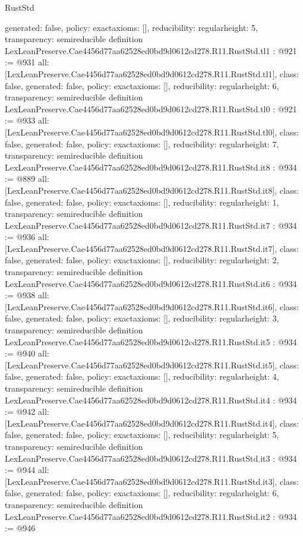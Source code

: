 \begin{lexlean}{RustStd}
\begin{coremodule}
{  generated: false,
  policy: exact{axioms: []},
  reducibility: regular{height: 5},
  transparency: semireducible
}
definition LexLeanPreserve.Cae4456d77aa62528ed0bd9d0612cd278.R11.RustStd.tl1 : @921 := @931 {
  all: [LexLeanPreserve.Cae4456d77aa62528ed0bd9d0612cd278.R11.RustStd.tl1],
  class: false,
  generated: false,
  policy: exact{axioms: []},
  reducibility: regular{height: 6},
  transparency: semireducible
}
definition LexLeanPreserve.Cae4456d77aa62528ed0bd9d0612cd278.R11.RustStd.tl0 : @921 := @933 {
  all: [LexLeanPreserve.Cae4456d77aa62528ed0bd9d0612cd278.R11.RustStd.tl0],
  class: false,
  generated: false,
  policy: exact{axioms: []},
  reducibility: regular{height: 7},
  transparency: semireducible
}
definition LexLeanPreserve.Cae4456d77aa62528ed0bd9d0612cd278.R11.RustStd.it8 : @934 := @889 {
  all: [LexLeanPreserve.Cae4456d77aa62528ed0bd9d0612cd278.R11.RustStd.it8],
  class: false,
  generated: false,
  policy: exact{axioms: []},
  reducibility: regular{height: 1},
  transparency: semireducible
}
definition LexLeanPreserve.Cae4456d77aa62528ed0bd9d0612cd278.R11.RustStd.it7 : @934 := @936 {
  all: [LexLeanPreserve.Cae4456d77aa62528ed0bd9d0612cd278.R11.RustStd.it7],
  class: false,
  generated: false,
  policy: exact{axioms: []},
  reducibility: regular{height: 2},
  transparency: semireducible
}
definition LexLeanPreserve.Cae4456d77aa62528ed0bd9d0612cd278.R11.RustStd.it6 : @934 := @938 {
  all: [LexLeanPreserve.Cae4456d77aa62528ed0bd9d0612cd278.R11.RustStd.it6],
  class: false,
  generated: false,
  policy: exact{axioms: []},
  reducibility: regular{height: 3},
  transparency: semireducible
}
definition LexLeanPreserve.Cae4456d77aa62528ed0bd9d0612cd278.R11.RustStd.it5 : @934 := @940 {
  all: [LexLeanPreserve.Cae4456d77aa62528ed0bd9d0612cd278.R11.RustStd.it5],
  class: false,
  generated: false,
  policy: exact{axioms: []},
  reducibility: regular{height: 4},
  transparency: semireducible
}
definition LexLeanPreserve.Cae4456d77aa62528ed0bd9d0612cd278.R11.RustStd.it4 : @934 := @942 {
  all: [LexLeanPreserve.Cae4456d77aa62528ed0bd9d0612cd278.R11.RustStd.it4],
  class: false,
  generated: false,
  policy: exact{axioms: []},
  reducibility: regular{height: 5},
  transparency: semireducible
}
definition LexLeanPreserve.Cae4456d77aa62528ed0bd9d0612cd278.R11.RustStd.it3 : @934 := @944 {
  all: [LexLeanPreserve.Cae4456d77aa62528ed0bd9d0612cd278.R11.RustStd.it3],
  class: false,
  generated: false,
  policy: exact{axioms: []},
  reducibility: regular{height: 6},
  transparency: semireducible
}
definition LexLeanPreserve.Cae4456d77aa62528ed0bd9d0612cd278.R11.RustStd.it2 : @934 := @946 {
}
\end{coremodule}
\end{lexlean}
